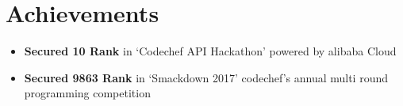 \documentclass[a4paper,1pt]{article}
\begin{document}
\section{Achievements}{\raggedbottom}
\begin{itemize}
\item \textbf{Secured 10 Rank} in ‘Codechef API Hackathon' powered by alibaba Cloud
\item \textbf{Secured 9863 Rank} in ‘Smackdown 2017' codechef's annual multi round programming competition
\end{itemize}
\end{document}
